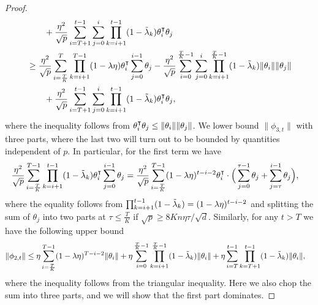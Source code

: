 \begin{proof}
\begin{align*}
        & \qquad + \frac{\eta^2}{\sqrt p}\sum_{i=T+1}^{t-1}\sum_{j=0}^i\prod_{k=i+1}^{t-1}(1-\tlam_k)\theta_i\transpose\theta_j \\
        & \geq \frac{\eta^2}{\sqrt p}\sum_{i=\frac{T}{K}}^{T}\prod_{k=i+1}^{T-1}(1-\lambda\eta)\theta_i\transpose\sum_{j=0}^{i-1} \theta_j - \frac{\eta^2}{\sqrt p}\sum_{i=0}^{\frac{T}{K}-1}\sum_{j=0}^i\prod_{k=i+1}^{\frac{T}{K}-1}(1-\tlam_k) \|\theta_i\|\|\theta_j\| \\
        & \qquad + \frac{\eta^2}{\sqrt p}\sum_{i=T+1}^{t-1}\sum_{j=0}^i\prod_{k=i+1}^{t-1}(1-\tlam_k) \theta_i\transpose \theta_j,
    \end{align*}
    where the inequality follows from $\theta_i\transpose\theta_j \leq \|\theta_i\|\|\theta_j\|$. We lower bound $\|\phi_{3,t}\|$ with three parts, where the last two will turn out to be bounded by quantities independent of $p$. In particular, for the first term we have 
    \begin{align*}
        \frac{\eta^2}{\sqrt p}\sum_{i=\frac{T}{K}}^{T-1}\prod_{k=i+1}^{t-1}(1-\tlam_k)\theta_i\transpose\sum_{j=0}^{i-1} \theta_j & = \frac{\eta^2}{\sqrt p} \sum_{i=\frac{T}{K}}^{T-1} (1-\lambda\eta)^{t-i-2} \theta_i\transpose \cdot \Big( \sum_{j=0}^{\tau-1} \theta_j + \sum_{j=\tau}^{i-1} \theta_j \Big),
    \end{align*}
    where the equality follows from $\prod_{k=i+1}^{t-1}(1-\tilde{\lambda}_k) = (1-\lambda\eta)^{t-i-2}$ and splitting the sum of $\theta_j$ into two parts at $\tau\leq \frac{T}{K}$ if $\sqrt{p} \geq 8Kn\eta\tau/\sqrt{d}$. 
    Similarly, for any $t>T$ we have the following upper bound
    \begin{align*}
        \|\phi_{2,t}\| 
        &\leq  \eta\sum_{i=\frac{T}{K}}^{T-1} (1-\lambda\eta)^{T-i-2} \|\theta_i\| + \eta\sum_{i=0}^{\frac{T}{K}-1}\prod_{k=i+1}^{\frac{T}{K}-1}(1-\tilde{\lambda}_k) \|\theta_i\| + \eta\sum_{i=T}^{t-1} \prod_{k=T+1}^{t-1}(1-\tilde{\lambda}_k) \|\theta_i\|,
    \end{align*}
    where the inequality follows from the triangular inequality. Here we also chop the sum into three parts, and we will show that the first part dominates. 
    

\end{proof}

